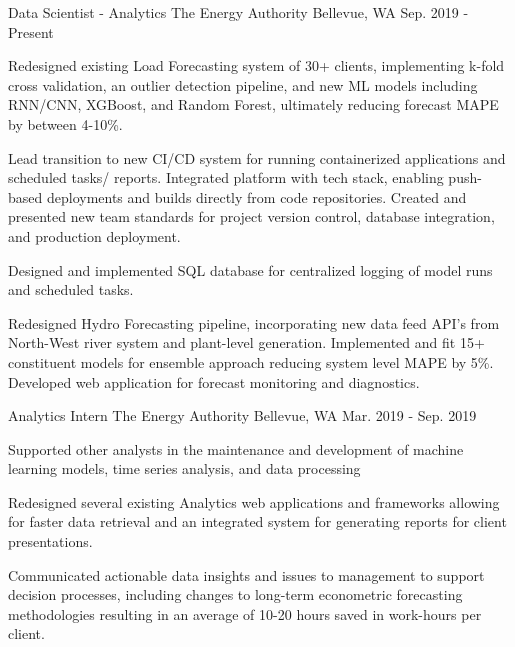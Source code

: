 

\begin{cventries}

  \cventry
    {Data Scientist - Analytics} %
    {The Energy Authority} %
    {Bellevue, WA} %
    {Sep. 2019 - Present} %
    {
      \begin{cvitems} %
        \item {Redesigned existing Load Forecasting system of 30+ clients, implementing k-fold cross validation, an outlier detection pipeline, and new ML models including RNN/CNN, XGBoost, and Random Forest, ultimately reducing forecast MAPE by between 4-10\%.}
        \item {Lead transition to new CI/CD system for running containerized applications and scheduled tasks/ reports. Integrated platform with tech stack, enabling push-based deployments and builds directly from code repositories. Created and presented new team standards for project version control, database integration, and production deployment.}
        \item {Designed and implemented SQL database for centralized logging of model runs and scheduled tasks.}
        \item {Redesigned Hydro Forecasting pipeline, incorporating new data feed API's from North-West river system and plant-level generation. Implemented and fit 15+ constituent models for ensemble approach reducing system level MAPE by 5\%. Developed web application for forecast monitoring and diagnostics.}
      \end{cvitems}
    }

  \cventry
    {Analytics Intern} %
    {The Energy Authority} %
    {Bellevue, WA} %
    {Mar. 2019 - Sep. 2019} %
    {
      \begin{cvitems} %
        \item {Supported other analysts in the maintenance and development of machine learning models, time series analysis, and data processing}
        \item {Redesigned several existing Analytics web applications and frameworks allowing for faster data retrieval and an integrated system for generating reports for client presentations.}
        \item {Communicated actionable data insights and issues to management to support decision processes, including changes to long-term econometric forecasting methodologies resulting in an average of 10-20 hours saved in work-hours per client.}
      \end{cvitems}
    }


\end{cventries}
